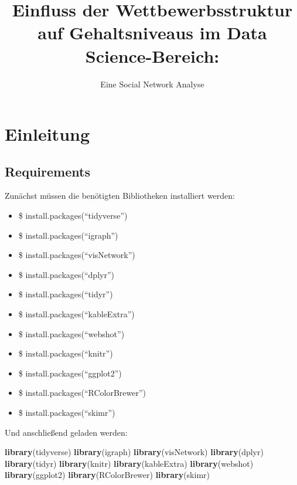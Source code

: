 \documentclass[
]{article}
\title{Einfluss der Wettbewerbsstruktur auf Gehaltsniveaus im Data
Science-Bereich:}
\subtitle{Eine Social Network Analyse}
\author{}
\date{\vspace{-2.5em}}
\newenvironment{Shaded}{\begin{snugshade}}{\end{snugshade}}
\newcommand{\FunctionTok}[1]{\textcolor[rgb]{0.13,0.29,0.53}{\textbf{#1}}}
\newcommand{\NormalTok}[1]{#1}
\providecommand{\tightlist}{%
  \setlength{\itemsep}{0pt}\setlength{\parskip}{0pt}}
\begin{document}
\maketitle

{
\setcounter{tocdepth}{3}
\tableofcontents
}
\newpage

\section{Einleitung}\label{einleitung}

\subsection{Requirements}\label{requirements}

Zunächst müssen die benötigten Bibliotheken installiert werden:

\begin{itemize}
\tightlist
\item
  \$ install.packages(``tidyverse'')
\item
  \$ install.packages(``igraph'')
\item
  \$ install.packages(``visNetwork'')
\item
  \$ install.packages(``dplyr'')
\item
  \$ install.packages(``tidyr'')
\item
  \$ install.packages(``kableExtra'')
\item
  \$ install.packages(``webshot'')
\item
  \$ install.packages(``knitr'')
\item
  \$ install.packages(``ggplot2'')
\item
  \$ install.packages(``RColorBrewer'')
\item
  \$ install.packages(``skimr'')
\end{itemize}

Und anschließend geladen werden:

\begin{Shaded}
\begin{Highlighting}[]
\FunctionTok{library}\NormalTok{(tidyverse)}
\FunctionTok{library}\NormalTok{(igraph)}
\FunctionTok{library}\NormalTok{(visNetwork)}
\FunctionTok{library}\NormalTok{(dplyr)}
\FunctionTok{library}\NormalTok{(tidyr)}
\FunctionTok{library}\NormalTok{(knitr)}
\FunctionTok{library}\NormalTok{(kableExtra)}
\FunctionTok{library}\NormalTok{(webshot)}
\FunctionTok{library}\NormalTok{(ggplot2)}
\FunctionTok{library}\NormalTok{(RColorBrewer)}
\FunctionTok{library}\NormalTok{(skimr)}
\end{Highlighting}
\end{Shaded}
\end{document}
